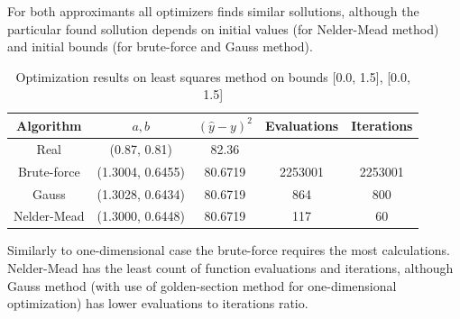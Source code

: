 For both approximants all optimizers finds similar sollutions, although the particular found sollution depends 
on initial values (for Nelder-Mead method) and initial bounds (for brute-force and Gauss method).

\begin{table}[h!]
    \begin{center}
        \caption{Optimization results on least squares method on bounds [0.0, 1.5], [0.0, 1.5]}
        \begin{tabular}{|c|c|c|c|c|}
            \textbf{Algorithm} & \textbf{$a, b$} & \textbf{$(\hat{y} - y)^2$} & \textbf{Evaluations} & \textbf{Iterations}\\
            \hline
            Real & (0.87, 0.81) & 82.36 & &\\
            Brute-force & (1.3004, 0.6455) & 80.6719 & 2253001 & 2253001 \\
            Gauss & (1.3028, 0.6434) & 80.6719 & 864 & 800 \\
            Nelder-Mead & (1.3000, 0.6448) & 80.6719 & 117 & 60
        \end{tabular}
    \end{center}
\end{table}


Similarly to one-dimensional case the brute-force requires the most calculations. Nelder-Mead has the least count of function evaluations and iterations, although Gauss method (with use of golden-section method for one-dimensional optimization) has lower evaluations to iterations ratio.

